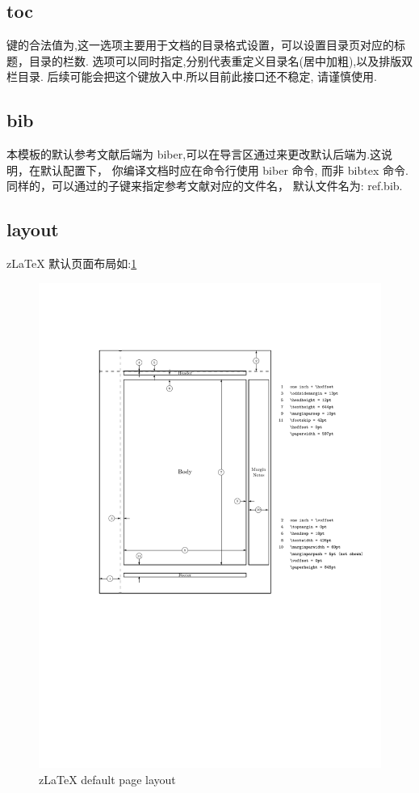 \subsection{toc}
键的合法值为,这一选项主要用于文档的目录格式设置，可以设置目录页对应的标题，目录的栏数.
选项可以同时指定,分别代表重定义目录名(居中加粗),以及排版双栏目录.
后续可能会把这个键放入中.所以目前此接口还不稳定, 请谨慎使用.

\subsection{bib}
本模板的默认参考文献后端为 {biber},可以在导言区通过来更改默认后端为.这说明，在默认配置下，
你编译文档时应在命令行使用 {biber} 命令, 而非 {bibtex} 命令. 同样的，可以通过的子键来指定参考文献对应的文件名，
默认文件名为: {ref.bib}. 

\subsection{layout}\label{sec:slide-mode}
z\LaTeX{} 默认页面布局如:\cref{fig:zlatex-default-layout}
\begin{figure}[!htb]
  \centering
  \includegraphics[width=.9\linewidth]{./pics/zlatex_layout_default.pdf}
  \caption{z\LaTeX{} default page layout}
  \label{fig:zlatex-default-layout}
\end{figure}

